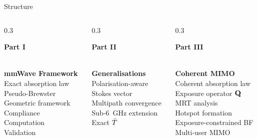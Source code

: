 \begin{frame}{Structure}

  \begin{columns}[T]
    \begin{column}{0.3\textwidth}
      \begin{center}
        \colorbox{activetab}{\color{white}\small\strut\;\textbf{Part I}\;}\\[6pt]
        {\small\bfseries mmWave Framework}\\[6pt]
        {\footnotesize
          Exact absorption law\\
          Pseudo-Brewster\\
          Geometric framework\\
          Compliance\\
          Computation\\
          Validation
        }
      \end{center}
    \end{column}

    \begin{column}{0.3\textwidth}
      \begin{center}
        \colorbox{activetab}{\color{white}\small\strut\;\textbf{Part II}\;}\\[6pt]
        {\small\bfseries Generalisations}\\[6pt]
        {\footnotesize
          Polarisation-aware\\
          Stokes vector\\
          Multipath convergence\\
          Sub-\SI{6}{\giga\hertz} extension\\
          Exact $\bar{T}$
        }
      \end{center}
    \end{column}

    \begin{column}{0.3\textwidth}
      \begin{center}
        \colorbox{activetab}{\color{white}\small\strut\;\textbf{Part III}\;}\\[6pt]
        {\small\bfseries Coherent MIMO}\\[6pt]
        {\footnotesize
          Coherent absorption law\\
          Exposure operator $\mathbf{Q}$\\
          MRT analysis\\
          Hotspot formation\\
          Exposure-constrained BF\\
          Multi-user MIMO
        }
      \end{center}
    \end{column}
  \end{columns}

\end{frame}

